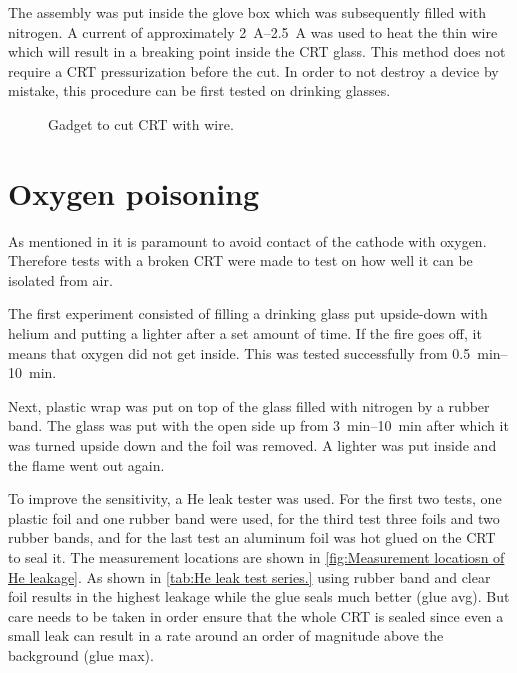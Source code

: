 The assembly was put inside the glove box which was subsequently filled with nitrogen. A current of approximately \SIrange{2}{2.5}{\ampere} was used to heat the thin wire which will result in a breaking point inside the CRT glass. This method does not require a CRT pressurization before the cut. In order to not destroy a device by mistake, this procedure can be first tested on drinking glasses.

\begin{figure}[h]
	
	\caption{Gadget to cut CRT with wire.}
	\label{fig:Gadget to cut CRT with wire}
\end{figure}


\section{Oxygen poisoning}
\label{sec:Oxygen poisoning}


As mentioned in  it is paramount to avoid contact of the cathode with oxygen. Therefore tests with a broken CRT were made to test on how well it can be isolated from air.

The first experiment consisted of filling a drinking glass put upside-down with helium and putting a lighter after a set amount of time. If the fire goes off, it means that oxygen did not get inside. This was tested successfully from \SIrange{0.5}{10}{\minute}.

Next, plastic wrap was put on top of the glass filled with nitrogen by a rubber band. The glass was put with the open side up from \SIrange{3}{10}{\minute} after which it was turned upside down and the foil was removed. A lighter was put inside and the flame went out again.

To improve the sensitivity, a He leak tester was used. For the first two tests, one plastic foil and one rubber band were used, for the third test three foils and two rubber bands, and for the last test an aluminum foil was hot glued on the CRT to seal it. The measurement locations are shown in \cref{fig:Measurement locatiosn of He leakage}. As shown in \cref{tab:He leak test series.}  using rubber band and clear foil results in the highest leakage while the glue seals much better (glue avg). But care needs to be taken in order ensure that the whole CRT is sealed since even a small leak can result in a rate around an order of magnitude above the background (glue max).

